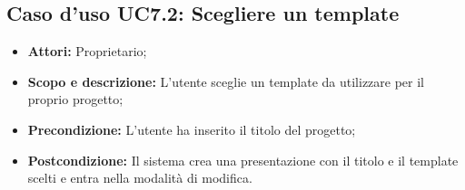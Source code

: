 \subsection{Caso d'uso UC7.2: Scegliere un template}
\begin{itemize}
	\item \textbf{Attori:} Proprietario;
	\item \textbf{Scopo e descrizione:} L'utente sceglie un \gls{template} da utilizzare per il proprio progetto;
	\item \textbf{Precondizione:} L'utente ha inserito il titolo del progetto;
	\item \textbf{Postcondizione:} Il sistema crea una presentazione con il titolo e il \gls{template} scelti e entra nella modalità di modifica.
\end{itemize}


